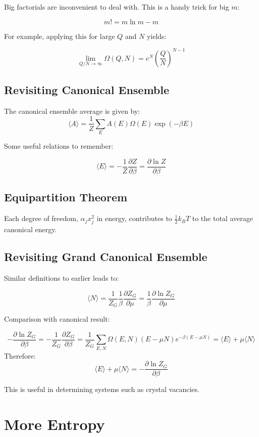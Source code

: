 \documentclass[12pt]{article}
\begin{document}
Big factorials are inconvenient to deal with. This is a handy trick for big $m$:

\[ \boxed{ m! = m\ln{m} - m}\]

For example, applying this for large $Q$ and $N$ yields:

\[\lim_{Q/N\to\infty}\Omega(Q,N) = e^N \left(\frac{Q}{N}\right)^{N-1}\]

\subsection{Revisiting Canonical Ensemble}

The canonical ensemble average is given by:
\[\langle A \rangle = \frac{1}{Z}\sum_E A(E)\Omega(E)\exp{(-\beta E)}\]

Some useful relations to remember:

\[\boxed{\langle E \rangle = -\frac{1}{Z}\frac{\partial Z}{\partial \beta} = \frac{\partial \ln Z}{\partial \beta}}\]


\subsection{Equipartition Theorem}

Each degree of freedom, $\alpha_j x_j^2$ in energy, contributes to $\frac12 k_B T$ to the total average canonical energy.


\subsection{Revisiting Grand Canonical Ensemble}

Similar definitions to earlier leads to:

\[\boxed{\langle N \rangle = \frac{1}{Z_G}\frac{1}{\beta}\frac{\partial Z_G}{\partial \mu} = \frac{1}{\beta}\frac{\partial \ln Z_G}{\partial \mu}}\]

Comparison with canonical result:

\[-\frac{\partial \ln Z_G}{\partial \beta} = -\frac{1}{Z_G}\frac{\partial Z_G}{\partial \beta} = \frac{1}{Z_G}\sum_{E,N}\Omega(E,N)(E-\mu N)e^{-\beta(E-\mu N)} = \langle E \rangle + \mu \langle N \rangle\]
Therefore:
\[\boxed{\langle E \rangle + \mu \langle N \rangle = -\frac{\partial \ln Z_G}{\partial \beta}}\]

This is useful in determining systems such as crystal vacancies.

\section{More Entropy}
\end{document}
